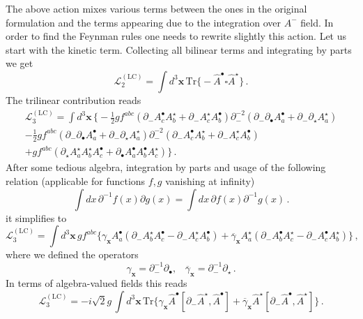 \documentclass[english,american]{article}
\begin{document}
The above action mixes various terms between the ones in the  original formulation and
the terms appearing due to the integration over $A^{-}$ field. In
order to find the Feynman rules one needs to rewrite slightly this action. Let us start
with the kinetic term. Collecting all bilinear terms and integrating
by parts we get 
\begin{equation}
\mathcal{L}_{2}^{\left(\mathrm{LC}\right)}=\int d^{3}\mathbf{x}\,\mathrm{Tr}\Bigg\{-\hat{A}^{\bullet}\square\hat{A}^{\star}\Bigg\}\,.
\end{equation}
The trilinear contribution reads
\begin{multline}
\mathcal{L}_{3}^{\left(\mathrm{LC}\right)}=\int d^{3}\mathbf{x}\,\Bigg\{-\frac{1}{2}gf^{abc}\left(\partial_{-}A_{c}^{\bullet}A_{b}^{\star}+\partial_{-}A_{c}^{\star}A_{b}^{\bullet}\right)\partial_{-}^{-2}\left(\partial_{-}\partial_{\bullet}A_{a}^{\bullet}+\partial_{-}\partial_{\star}A_{a}^{\star}\right)\\
-\frac{1}{2}gf^{abc}\left(\partial_{-}\partial_{\bullet}A_{a}^{\bullet}+\partial_{-}\partial_{\star}A_{a}^{\star}\right)\partial_{-}^{-2}\left(\partial_{-}A_{c}^{\bullet}A_{b}^{\star}+\partial_{-}A_{c}^{\star}A_{b}^{\bullet}\right)\\
+gf^{abc}\left(\partial_{\star}A_{a}^{\star}A_{b}^{\star}A_{c}^{\bullet}+\partial_{\bullet}A_{a}^{\bullet}A_{b}^{\bullet}A_{c}^{\star}\right)\Bigg\}\,.\label{eq:L3LC}
\end{multline}
After some tedious algebra, integration by parts and usage of the
following relation (applicable for functions $f,g$ vanishing at infinity)
\begin{equation}
\int dx\,\partial^{-1}f\left(x\right)\partial g\left(x\right)=\int dx\,\partial f\left(x\right)\partial^{-1}g\left(x\right)\,.
\end{equation}
it simplifies to
\begin{equation}
\mathcal{L}_{3}^{\left(\mathrm{LC}\right)}=\int d^{3}\mathbf{x}\, gf^{abc}\Bigg\{\gamma_{\mathbf{x}}A_{a}^{\bullet}\left(\partial_{-}A_{b}^{\star}A_{c}^{\bullet}-\partial_{-}A_{c}^{\star}A_{b}^{\bullet}\right)+\overline{\gamma}_{\mathbf{x}}A_{a}^{\star}\left(\partial_{-}A_{b}^{\bullet}A_{c}^{\star}-\partial_{-}A_{c}^{\bullet}A_{b}^{\star}\right)\Bigg\}\,,
\end{equation}
where we defined the operators
\begin{equation}
\gamma_{\mathbf{x}}=\partial_{-}^{-1}\partial_{\bullet},\,\,\,\,\,\overline{\gamma}_{\mathbf{x}}=\partial_{-}^{-1}\partial_{\star}\,.
\end{equation}
In terms of algebra-valued fields this reads
\begin{equation}
\mathcal{L}_{3}^{\left(\mathrm{LC}\right)}=-i\sqrt{2}g\,\int d^{3}\mathbf{x}\,\mathrm{Tr}\Bigg\{\gamma_{\mathbf{x}}\hat{A}^{\bullet}\left[\partial_{-}\hat{A}^{\star},\hat{A}^{\bullet}\right]+\overline{\gamma}_{\mathbf{x}}\hat{A}^{\star}\left[\partial_{-}\hat{A}^{\bullet},\hat{A}^{\star}\right]\Bigg\}\,.
\end{equation}
\end{document}
